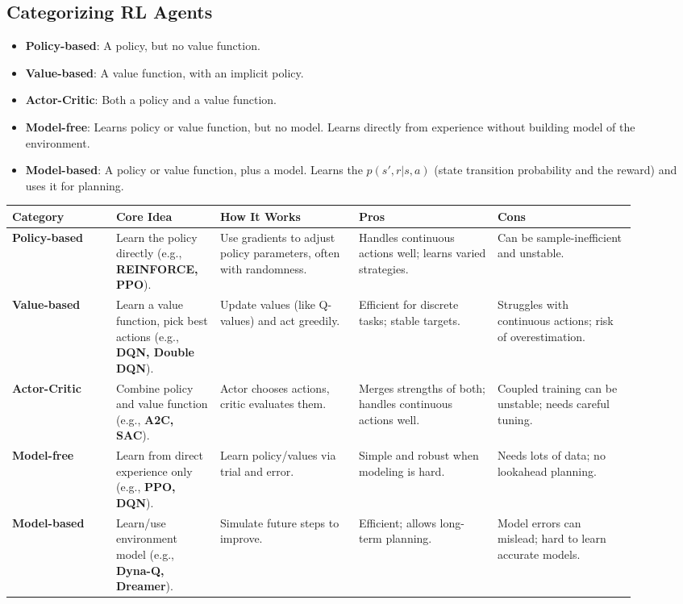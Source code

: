 \documentclass[12pt]{article}
\begin{document}
\subsection{Categorizing RL Agents}
\begin{itemize}
    \item \textbf{Policy-based}: A policy, but no value function.
    \item \textbf{Value-based}: A value function, with an implicit policy.
    \item \textbf{Actor-Critic}: Both a policy and a value function.
    \item \textbf{Model-free}: Learns policy or value function, but no model. Learns directly from experience without building model of the environment.
    \item \textbf{Model-based}: A policy or value function, plus a model. Learns the $p(s',r|s,a)$ (state transition probability and the reward) and uses it for planning.
\end{itemize}
\begin{tabular}{|p{0.15\linewidth}|p{0.15\linewidth}|p{0.2\linewidth}|p{0.2\linewidth}|p{0.2\linewidth}|}
\hline
\textbf{Category} & \textbf{Core Idea} & \textbf{How It Works} & \textbf{Pros} & \textbf{Cons} \\
\hline
\textbf{Policy-based} & Learn the policy directly (e.g., \textbf{REINFORCE, PPO}). & Use gradients to adjust policy parameters, often with randomness. & Handles continuous actions well; learns varied strategies. & Can be sample-inefficient and unstable. \\
\hline
\textbf{Value-based} & Learn a value function, pick best actions (e.g., \textbf{DQN, Double DQN}). & Update values (like Q-values) and act greedily. & Efficient for discrete tasks; stable targets. & Struggles with continuous actions; risk of overestimation. \\
\hline
\textbf{Actor-Critic} & Combine policy and value function (e.g., \textbf{A2C, SAC}). & Actor chooses actions, critic evaluates them. & Merges strengths of both; handles continuous actions well. & Coupled training can be unstable; needs careful tuning. \\
\hline
\textbf{Model-free} & Learn from direct experience only (e.g., \textbf{PPO, DQN}). & Learn policy/values via trial and error. & Simple and robust when modeling is hard. & Needs lots of data; no lookahead planning. \\
\hline
\textbf{Model-based} & Learn/use environment model (e.g., \textbf{Dyna-Q, Dreamer}). & Simulate future steps to improve. & Efficient; allows long-term planning. & Model errors can mislead; hard to learn accurate models. \\
\hline
\end{tabular}
\end{document}
